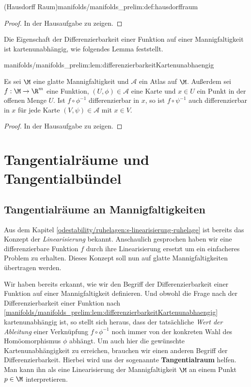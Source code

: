 \documentclass[letterpaper,10pt,english]{jupyterBook}
\begin{document}
\begin{definition}{(Hausdorff Raum)}{manifolds/manifolds_prelim:def:hausdorffraum}
\begin{proof}
 In der Hausaufgabe zu zeigen.
\end{proof}

\par
Die Eigenschaft der Differenzierbarkeit einer Funktion auf einer Mannigfaltigkeit ist kartenunabhängig, wie folgendes Lemma feststellt.
\begin{lemma}{}{manifolds/manifolds_prelim:lem:differenzierbarkeitKartenunabhaengig}



\par
Es sei \(\M\) eine glatte Mannigfaltigkeit und \(\mathcal{A}\) ein Atlas auf \(\M\).
Außerdem sei \(f:\M \to \R^m\) eine Funktion, \((U,\phi)\in \mathcal{A}\) eine Karte und \(x \in U\) ein Punkt in der offenen Menge \(U\).
Ist \(f\circ\phi^{-1}\) differenzierbar in \(x\), so ist \(f\circ\psi^{-1}\) auch differenzierbar in \(x\) für jede Karte \((V,\psi) \in \mathcal{A}\) mit \(x\in V\).
\end{lemma}

\begin{proof}
 In der Hausaufgabe zu zeigen.
\end{proof}


\section{Tangentialräume und Tangentialbündel}
\label{\detokenize{manifolds/tangential:tangentialraume-und-tangentialbundel}}\label{\detokenize{manifolds/tangential::doc}}

\subsection{Tangentialräume an Mannigfaltigkeiten}
\label{\detokenize{manifolds/tangential:tangentialraume-an-mannigfaltigkeiten}}
\par
Aus dem Kapitel \cref{odestability/ruhelagen:s-linearisierung-ruhelage}  ist bereits das Konzept der \emph{Linearisierung} bekannt.
Anschaulich gesprochen haben wir eine differenzierbare Funktion \(f\) durch ihre Linearisierung ersetzt um ein einfacheres Problem zu erhalten.
Dieses Konzept soll nun auf glatte Mannigfaltigkeiten übertragen werden.

\par
Wir haben bereits erkannt, wie wir den Begriff der Differenzierbarkeit einer Funktion auf einer Mannigfaltigkeit definieren.
Und obwohl die Frage nach der Differenzierbarkeit einer Funktion nach \cref{manifolds/manifolds_prelim:lem:differenzierbarkeitKartenunabhaengig} kartenunabhängig ist, so stellt sich heraus, dass der tatsächliche \emph{Wert der Ableitung} einer Verknüpfung \(f \circ\phi^{-1}\) noch immer von der konkreten Wahl des Homöomorphismus \(\phi\) abhängt.
Um auch hier die gewünschte Kartenunabhängigkeit zu erreichen, brauchen wir einen anderen Begriff der Differenzierbarkeit.
Hierbei wird uns der sogenannte \textbf{Tangentialraum} helfen.
Man kann ihn als eine Linearisierung der Mannigfaltigkeit \(\M\) an einem Punkt \(p\in\M\) interpretieren.


\end{definition}
\end{document}
